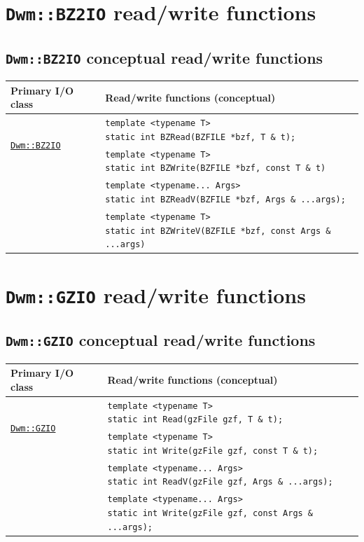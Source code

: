 \section{\texttt{Dwm::BZ2IO} read/write functions}
\subsection{\texttt{Dwm::BZ2IO} conceptual read/write functions}
\begin{tabular}{ll}
  \textbf{Primary I/O class} & \textbf{Read/write functions (conceptual)} \\ \hline
  \multirow{2}{*}{\hyperref[section:DwmBZ2IOClass]{\texttt{Dwm::BZ2IO}}} & \makecell[l]{\texttt{template <typename T>}\\ \texttt{static int BZRead(BZFILE *bzf, T \& t);}} \\ \cline{2-2}
  & \makecell[l]{\texttt{template <typename T>}\\ \texttt{static int BZWrite(BZFILE *bzf, const T \& t)}} \\ \cline{2-2}
 & \makecell[l]{\texttt{template <typename... Args>}\\ \texttt{static int BZReadV(BZFILE *bzf, Args \& ...args);}} \\ \cline{2-2}
  & \makecell[l]{\texttt{template <typename T>}\\ \texttt{static int BZWriteV(BZFILE *bzf, const Args \& ...args)}} \\ \hline
\end{tabular}

\section{\texttt{Dwm::GZIO} read/write functions}
\subsection{\texttt{Dwm::GZIO} conceptual read/write functions}
\begin{tabular}{ll}
  \textbf{Primary I/O class} & \textbf{Read/write functions (conceptual)} \\ \hline
  \multirow{2}{*}{\hyperref[section:DwmGZIOClass]{\texttt{Dwm::GZIO}}} & \makecell[l]{\texttt{template <typename T>}\\ \texttt{static int Read(gzFile gzf, T \& t);}} \\ \cline{2-2}
  & \makecell[l]{\texttt{template <typename T>}\\ \texttt{static int Write(gzFile gzf, const T \& t);}} \\ \cline{2-2}
 & \makecell[l]{\texttt{template <typename... Args>}\\ \texttt{static int ReadV(gzFile gzf, Args \& ...args);}} \\ \cline{2-2}
  & \makecell[l]{\texttt{template <typename... Args>}\\ \texttt{static int Write(gzFile gzf, const Args \& ...args);}} \\ \hline
\end{tabular}

